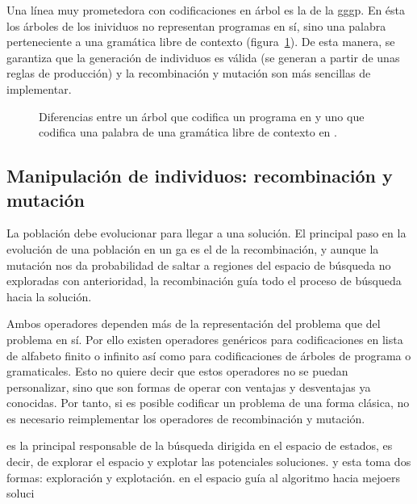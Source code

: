 Una línea muy prometedora con codificaciones en árbol es la de la \gls{gggp}. En ésta los árboles de los inividuos no representan programas en sí, sino una palabra perteneciente a una gramática libre de contexto (figura~\ref{fig:gp-vs-gggp}). De esta manera, se garantiza que la generación de individuos es válida (se generan a partir de unas reglas de producción) y la recombinación y mutación son más sencillas de implementar.

\begin{figure}[t]
	\caption[Diferencias entre representación de un genotipo como árbol tradicional y como árbol generado a partir de una gramática libre de contexto]{Diferencias entre un árbol que codifica un programa en  y uno que codifica una palabra de una gramática libre de contexto en .}
	\label{fig:gp-vs-gggp}
\end{figure}

\subsection{Manipulación de individuos: recombinación y mutación}

La población debe evolucionar para llegar a una solución. El principal paso en la evolución de una población en un \gls{ga} es el de la recombinación, y aunque la mutación nos da probabilidad de saltar a regiones del espacio de búsqueda no exploradas con anterioridad, la recombinación guía todo el proceso de búsqueda hacia la solución.

Ambos operadores dependen más de la representación del problema que del problema en sí. Por ello existen operadores genéricos para codificaciones en lista de alfabeto finito o infinito así como para codificaciones de árboles de programa o gramaticales. Esto no quiere decir que estos operadores no se puedan personalizar, sino que son formas de operar con ventajas y desventajas ya conocidas. Por tanto, si es posible codificar un problema de una forma clásica, no es necesario reimplementar los operadores de recombinación y mutación.

 es la principal responsable de la búsqueda dirigida en el espacio de estados, es decir, de explorar el espacio y explotar las potenciales soluciones. y esta toma dos formas: exploración y explotación. en el espacio guía al algoritmo hacia mejoers soluci

